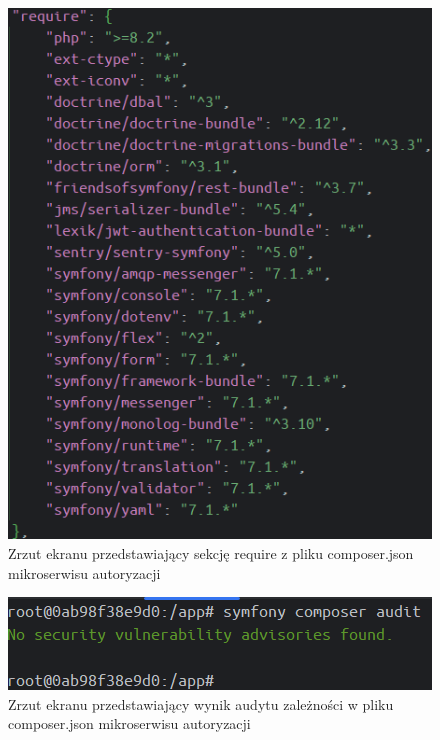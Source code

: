 \documentclass[12pt,twoside]{book}
\newcommand{\captionvspace}{\vspace{6pt}}
\begin{document}
    \begin{figure}[ht]
        \centering
        \includegraphics[width=\textwidth]{includes/images/composer-require-section.png}
        \captionvspace
        \caption{Zrzut ekranu przedstawiający sekcję require z pliku composer.json mikroserwisu autoryzacji}
        \label{fig:composer-require}
    \end{figure}

    \begin{figure}[ht]
        \centering
        \includegraphics[width=\textwidth]{includes/images/composer-audit.png}
        \captionvspace
        \caption{Zrzut ekranu przedstawiający wynik audytu zależności w pliku composer.json mikroserwisu autoryzacji}
        \label{fig:composer-audit}
    \end{figure}
\end{document}
